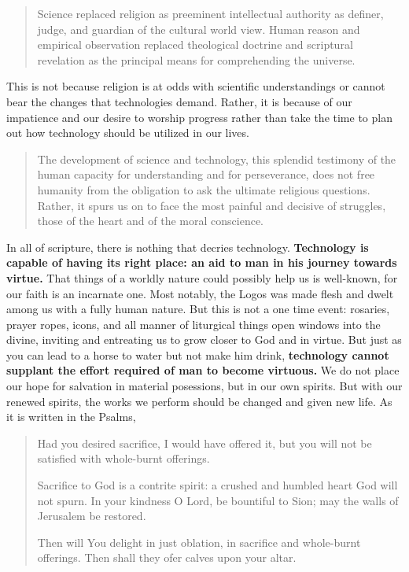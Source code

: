 \documentclass[letterpaper]{article}
\begin{document}
\begin{quote}
  Science replaced religion as preeminent intellectual authority as definer, judge, and guardian of the cultural world view. Human reason and empirical observation replaced theological doctrine and scriptural revelation as the principal means for comprehending the universe.
\end{quote}

This is not because religion is at odds with scientific understandings or cannot bear the changes that technologies demand. Rather, it is because of our impatience and our desire to worship progress rather than take the time to plan out how technology should be utilized in our lives.

\begin{quote}
  The development of science and technology, this splendid testimony of the human capacity for understanding and for perseverance, does not free humanity from the obligation to ask the ultimate religious questions. Rather, it spurs us on to face the most painful and decisive of struggles, those of the heart and of the moral conscience.
\end{quote}

In all of scripture, there is nothing that decries technology. \textbf{Technology is capable of having its right place: an aid to man in his journey towards virtue.} That things of a worldly nature could possibly help us is well-known, for our faith is an incarnate one. Most notably, the Logos was made flesh and dwelt among us with a fully human nature. But this is not a one time event: rosaries, prayer ropes, icons, and all manner of liturgical things open windows into the divine, inviting and entreating us to grow closer to God and in virtue. But just as you can lead to a horse to water but not make him drink, \textbf{technology cannot supplant the effort required of man to become virtuous.} We do not place our hope for salvation in material posessions, but in our own spirits. But with our renewed spirits, the works we perform should be changed and given new life. As it is written in the Psalms,

\begin{quote}
  Had you desired sacrifice, I would have offered it,
  but you will not be satisfied with whole-burnt offerings.

  Sacrifice to God is a contrite spirit:
  a crushed and humbled heart God will not spurn.
  In your kindness O Lord, be bountiful to Sion;
  may the walls of Jerusalem be restored.

  Then will You delight in just oblation,
  in sacrifice and whole-burnt offerings.
  Then shall they ofer calves upon your altar.
\end{quote}
\end{document}
